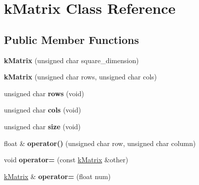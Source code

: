\hypertarget{classkMatrix}{}\section{k\+Matrix Class Reference}
\label{classkMatrix}
\subsection*{Public Member Functions}
\begin{DoxyCompactItemize}
\item 
{\bfseries k\+Matrix} (unsigned char square\+\_\+dimension)\hypertarget{classkMatrix_a5868ea1a392cab2599fe6800b5581d28}{}\label{classkMatrix_a5868ea1a392cab2599fe6800b5581d28}

\item 
{\bfseries k\+Matrix} (unsigned char rows, unsigned char cols)\hypertarget{classkMatrix_a28984eea87a03bff5b518713990f0eb9}{}\label{classkMatrix_a28984eea87a03bff5b518713990f0eb9}

\item 
unsigned char {\bfseries rows} (void)\hypertarget{classkMatrix_a364788171666de4935792ca12cad3b49}{}\label{classkMatrix_a364788171666de4935792ca12cad3b49}

\item 
unsigned char {\bfseries cols} (void)\hypertarget{classkMatrix_ae4e1b7b151a356b932e1c2b663e3107a}{}\label{classkMatrix_ae4e1b7b151a356b932e1c2b663e3107a}

\item 
unsigned char {\bfseries size} (void)\hypertarget{classkMatrix_a572b1a6fcb9d99b2ba449af7d76ab1ae}{}\label{classkMatrix_a572b1a6fcb9d99b2ba449af7d76ab1ae}

\item 
float \& {\bfseries operator()} (unsigned char row, unsigned char column)\hypertarget{classkMatrix_a8cda547bb01fb1730c5bac921c777c4e}{}\label{classkMatrix_a8cda547bb01fb1730c5bac921c777c4e}

\item 
void {\bfseries operator=} (const \hyperlink{classkMatrix}{k\+Matrix} \&other)\hypertarget{classkMatrix_a6111aac12009c07addb52950cd6f282a}{}\label{classkMatrix_a6111aac12009c07addb52950cd6f282a}

\item 
\hyperlink{classkMatrix}{k\+Matrix} \& {\bfseries operator=} (float num)\hypertarget{classkMatrix_ad2a5d42acda3da64177be9f897979baa}{}\label{classkMatrix_ad2a5d42acda3da64177be9f897979baa}


\end{DoxyCompactItemize}
